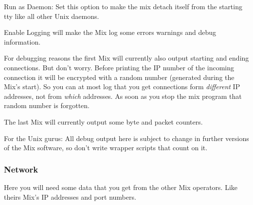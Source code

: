 \documentclass{article}
\begin{document}
\begin{description}

\item{Run as Daemon}: Set this option to make the mix detach itself from the 
  starting tty like all other Unix daemons.
  
\item{Enable Logging} will make the Mix log some errors warnings and
  debug information. 
  
  For debugging reasons the first Mix will currently also output
  starting and ending connections.  But don't worry.  Before printing
  the IP number of the incoming connection it will be encrypted
  with a random number (generated during the Mix's start). So you can
  at most log that you get connections form \emph{different} IP
  addresses, not from \emph{which} addresses. As soon as you stop the
  mix program that random number is forgotten.

  The last Mix will currently output some byte and packet counters.
  
  For the Unix gurus: All debug output here is subject to change in
  further versions of the Mix software, so don't write wrapper scripts
  that count on it.

\end{description}


\subsubsection{Network}

Here you will need some data that you get from the other Mix operators.
Like theirs Mix's IP addresses and port numbers.
\end{document}
